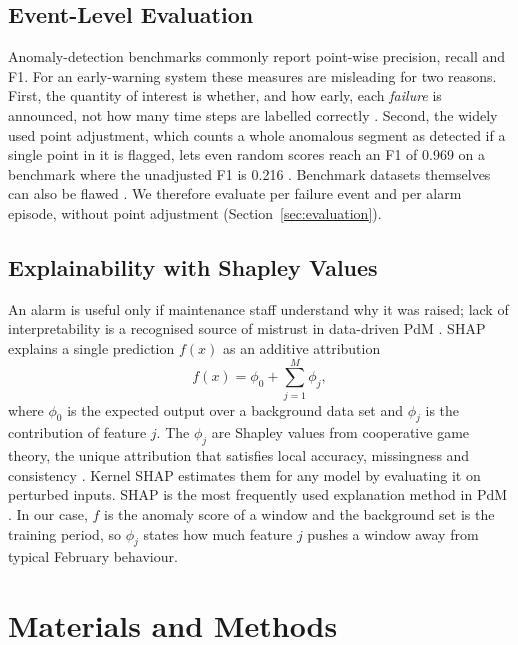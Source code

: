 \subsection{Event-Level Evaluation}
Anomaly-detection benchmarks commonly report point-wise precision, recall and F1. For an early-warning system these measures are misleading for two reasons. First, the quantity of interest is whether, and how early, each \emph{failure} is announced, not how many time steps are labelled correctly \citep{lavin2015nab,tatbul2018precision}. Second, the widely used point adjustment, which counts a whole anomalous segment as detected if a single point in it is flagged, lets even random scores reach an F1 of 0.969 on a benchmark where the unadjusted F1 is 0.216 \citep{kim2022rigorous}. Benchmark datasets themselves can also be flawed \citep{wu2021flawed}. We therefore evaluate per failure event and per alarm episode, without point adjustment (Section~\ref{sec:evaluation}).

\subsection{Explainability with Shapley Values}
An alarm is useful only if maintenance staff understand why it was raised; lack of interpretability is a recognised source of mistrust in data-driven PdM \citep{vollert2021interpretable}. SHAP \citep{lundberg2017shap} explains a single prediction $f(x)$ as an additive attribution
\begin{equation}
f(x) = \phi_0 + \sum_{j=1}^{M}\phi_j ,
\label{eq:shap}
\end{equation}
where $\phi_0$ is the expected output over a background data set and $\phi_j$ is the contribution of feature $j$. The $\phi_j$ are Shapley values from cooperative game theory, the unique attribution that satisfies local accuracy, missingness and consistency \citep{lundberg2017shap}. Kernel SHAP estimates them for any model by evaluating it on perturbed inputs. SHAP is the most frequently used explanation method in PdM \citep{cummins2024xpdm}. In our case, $f$ is the anomaly score of a window and the background set is the training period, so $\phi_j$ states how much feature $j$ pushes a window away from typical February behaviour.

\section{Materials and Methods}
\label{sec:methods}

